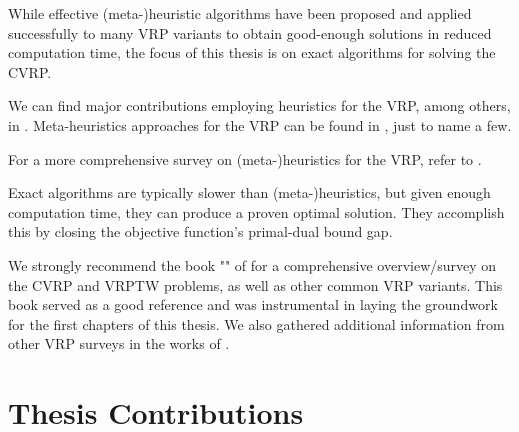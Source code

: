While effective (meta-)heuristic algorithms have been proposed and applied
successfully to many VRP variants to obtain good-enough solutions
in reduced computation time,
the focus of this thesis is on exact algorithms for solving the CVRP.

We can find major contributions employing heuristics for the VRP, among others, in
\textcite{clarke1964, desrochers1989matching, paessens1988savings, foster1976integer}.
Meta-heuristics approaches for the VRP can be found in
\textcite{gendreau1994tabu, cordeau2012parallel, toth2003granular, li2005very, pisinger2007, kytojoki2007efficient, nagata2009,vidal2012, subramanian2013},
just to name a few.

For a more comprehensive survey on (meta-)heuristics for the VRP, refer to
\textcite{golden1998impact,gendreau2002metaheuristics,gendreau2008,laporte2014chapter,elshaer2020taxonomic}.

Exact algorithms are typically slower than (meta-)heuristics, but given
enough computation time, they can produce a proven optimal solution.
They accomplish this by closing the objective function's primal-dual bound gap.

\medskip

We strongly recommend the book  "" of \textcite{toth2014}
for a comprehensive overview/survey on the CVRP and VRPTW problems,
as well as other common VRP variants.
This book served as a good reference and was instrumental in laying the groundwork
for the first chapters of this thesis.
We also gathered additional information from other VRP surveys in the works of
\textcite{cordeau2007, baldacci2012, caceres-cruz2015, costa2019}.

\section{Thesis Contributions}
\label{sec:intro-thesis-contributions}


